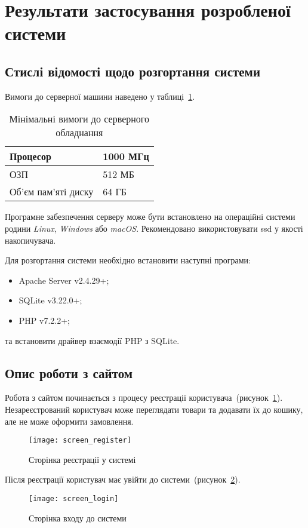 \section{Результати застосування розробленої системи}
\subsection{Стислі відомості щодо розгортання системи}

Вимоги до серверної машини наведено у таблиці~\ref{tab:sw_requirements}. 

\begin{table}[h]
	\caption{Мінімальні вимоги до серверного обладнання}
	\label{tab:sw_requirements}
	\begin{tabular}{l|l}
		Процесор & 1000 МГц \\ \hline
		ОЗП & 512 МБ \\ \hline
		Об'єм пам'яті диску & 64 ГБ 
	\end{tabular}
\end{table}

Програмне забезпечення серверу може бути встановлено на операційні системи родини \textit{Linux}, \textit{Windows} або \textit{macOS}.
Рекомендовано використовувати \acrshort{ssd} у якості накопичувача.

Для розгортання системи необхідно встановити наступні програми:
\begin{itemize}
	\item Apache Server v2.4.29+;
	\item SQLite v3.22.0+;
	\item PHP v7.2.2+;
\end{itemize}
та встановити драйвер взаємодії PHP з SQLite.

\subsection{Опис роботи з сайтом}
Робота з сайтом починається з процесу реєстрації користувача~(рисунок~\ref{fig:site_register}).
Незареєстрований користувач може переглядати товари та додавати їх до кошику, але не може оформити замовлення. 
\begin{figure}[H]
    \centering
    \texttt{[image: screen\_register]}
    \caption{Сторінка реєстрації у системі}
    \label{fig:site_register}
\end{figure}

Після реєстрації користувач має увійти до системи~(рисунок~\ref{fig:site_login}).
\begin{figure}[H]
    \centering
    \texttt{[image: screen\_login]}
    \caption{Сторінка входу до системи}
    \label{fig:site_login}
\end{figure}

